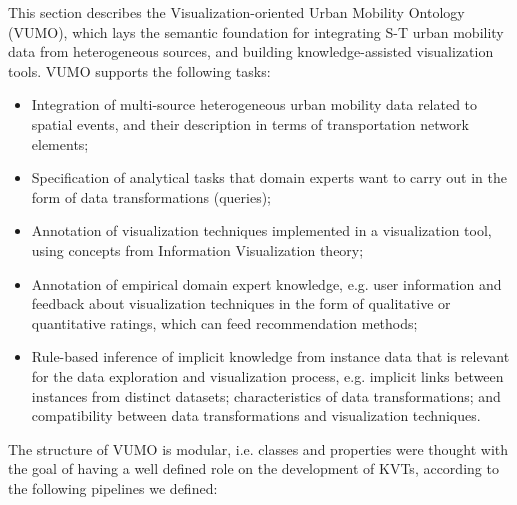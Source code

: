 \documentclass[]{interact}
\theoremstyle{plain}%
\theoremstyle{definition}
\theoremstyle{remark}
\theoremstyle{definition}
\begin{document}


This section describes the Visualization-oriented Urban Mobility Ontology (VUMO), which lays the semantic foundation for integrating S-T urban mobility data from heterogeneous sources, and building knowledge-assisted visualization tools. VUMO supports the following tasks:

\begin{itemize}
	\item Integration of multi-source heterogeneous urban mobility data related to spatial events, and their description in terms of transportation network elements;
	\item Specification of analytical tasks that domain experts want to carry out in the form of data transformations (queries);
	\item Annotation of visualization techniques implemented in a visualization tool, using concepts from Information Visualization theory;
	\item Annotation of empirical domain expert knowledge, e.g. user information and feedback about visualization techniques in the form of qualitative or quantitative ratings, which can feed recommendation methods;
	\item Rule-based inference of implicit knowledge from instance data that is relevant for the data exploration and visualization process, e.g. implicit links between instances from distinct datasets; characteristics of data transformations; and compatibility between data transformations and visualization techniques.
\end{itemize}

The structure of VUMO is modular, i.e. classes and properties were thought with the goal of having a well defined role on the development of KVTs, according to the following pipelines we defined:
\end{document}
